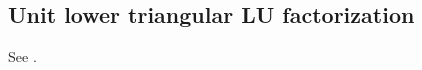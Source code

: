 \documentclass[10pt,twoside]{siamart1116}
\numberwithin{theorem}{section}
\providecommand{\DIFadd}[1]{{\protect\color{blue} \sf #1}} %
\providecommand{\DIFaddend}{} %
\begin{document}
\subsection{\DIFadd{Unit lower triangular LU factorization}}\DIFaddend \label{sec:python_unit_lower}

See .



\clearpage
{} %


\end{document}
